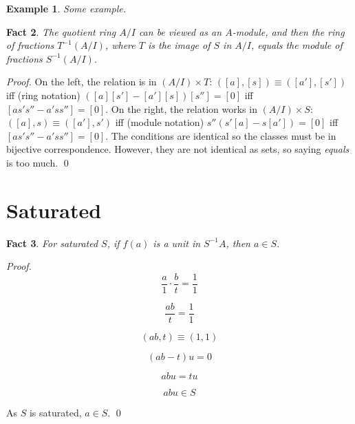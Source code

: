 \documentclass{article}
\newtheorem{theorem}{Fact}[section]
\newtheorem{example}[theorem]{Example}
\begin{document}
\begin{example}
Some example.
\end{example}

\begin{theorem}
The quotient ring $A/I$ can be viewed as an $A$-module, and then the ring of fractions $T^{-1}(A/I)$, where $T$ is the image of $S$ in $A/I$, equals the module of fractions $S^{-1}(A/I)$.
\end{theorem} 

\noindent
\textit{Proof.} On the left, the relation is in $ (A/I) \times T $: $ ([a], [s]) \equiv ([a'], [s']) $ iff (ring notation) $([a][s'] - [a'][s]) [s''] = [0]$ iff $[as's'' - a'ss''] = [0]$. On the right, the relation works in $ (A/I) \times S $: $ ([a], s) \equiv ([a'], s') $ iff (module notation) $s'' (s'[a] - s[a']) = [0]$ iff $[as's'' - a'ss''] = [0]$. The conditions are identical so the classes must be in bijective correspondence. However, they are not identical as sets, so saying \textit{equals} is too much.
\qed


\section{Saturated}

\begin{theorem}
For saturated $S$, if $f(a)$ is a unit in $S^{-1}A$, then $a \in S$.
\end{theorem}

\noindent
\textit{Proof.}
\[
  \frac{a}{1} \cdot \frac{b}{t} = \frac{1}{1} 
\]

\[
  \frac{ab}{t} = \frac{1}{1}
\]

\[
   (ab, t) \equiv (1, 1)
\]
 
\[
   (ab - t)u = 0
\]

\[
   abu = tu
\]

\[
   abu \in S
\]

As \( S \) is saturated, \( a \in S \).  \qed
\end{document}
